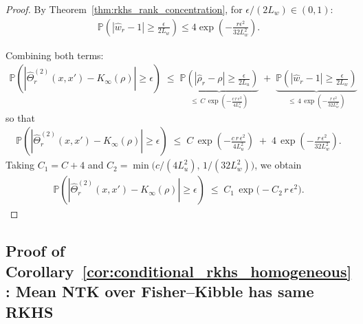 \begin{proof}
By Theorem~\ref{thm:rkhs_rank_concentration}, for \( \epsilon/(2L_w) \in (0,1) \):
\begin{align}
\mathbb{P}\!\left(|\hat{w}_r - 1| \ge \frac{\epsilon}{2L_w}\right) \le 4\exp\!\left(-\frac{r\epsilon^2}{32L_w^2}\right).
\end{align}

Combining both terms:
\begin{align}
\mathbb{P}\!\left(|\hat{\Theta}^{(2)}_r(x,x') - K_{\infty}(\rho)| \ge \epsilon\right)
\;\le\;
\underbrace{\mathbb{P}\!\left(|\hat{\rho}_r - \rho| \ge \frac{\epsilon}{2L_u}\right)}_{\le\, C\,\exp\!\left(-\frac{c\,r\,\epsilon^2}{4L_u^2}\right)}
\;+\;
\underbrace{\mathbb{P}\!\left(|\hat{w}_r - 1| \ge \frac{\epsilon}{2L_w}\right)}_{\le\, 4\,\exp\!\left(-\frac{r\,\epsilon^2}{32L_w^2}\right)}
\end{align}
so that
\begin{align}
\mathbb{P}\!\left(|\hat{\Theta}^{(2)}_r(x,x') - K_{\infty}(\rho)| \ge \epsilon\right)
\;\le\;
C\,\exp\!\left(-\frac{c\,r\,\epsilon^2}{4L_u^2}\right)
\;+\;
4\,\exp\!\left(-\frac{r\,\epsilon^2}{32L_w^2}\right).
\end{align}
Taking \(C_1 = C+4\) and \(C_2 = \min\!\big(c/(4L_u^2),\, 1/(32L_w^2)\big)\), we obtain
\begin{align}
\mathbb{P}\!\left(|\hat{\Theta}^{(2)}_r(x,x') - K_{\infty}(\rho)| \ge \epsilon\right)
\;\le\;
C_1\,\exp\!\big(-C_2\,r\,\epsilon^2\big).
\end{align}
\end{proof}





\subsection{Proof of Corollary~\ref{cor:conditional_rkhs_homogeneous}: Mean NTK over Fisher–Kibble has same RKHS}
\label{appendix:proof-conditional-rkhs-homogeneous}


